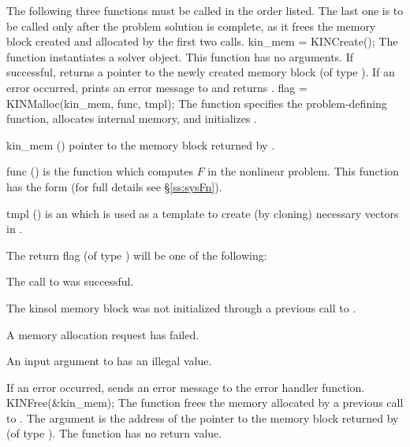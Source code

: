 The following three functions must be called in the order listed. The last one
is to be called only after the problem solution is complete, as it frees the
{\kinsol} memory block created and allocated by the first two calls.
{
  kin\_mem = KINCreate();
}
{
  The function  instantiates a {\kinsol} solver object.
}
{
  This function has no arguments.
}
{
  If successful,  returns a pointer to the newly created 
  {\kinsol} memory block (of type ).
  If an error occurred,  prints an error message to 
  and returns .
}
{}
{
flag = KINMalloc(kin\_mem, func, tmpl);
}
{
  The function  specifies the problem-defining
  function, allocates internal memory, and initializes {\kinsol}.
}
{
  \begin{args}
  \item[kin\_mem] ()
    pointer to the {\kinsol} memory block returned by .
  \item[func] ()
    is the {\C} function which computes $F$ in the nonlinear problem. 
    This function has the form  
    (for full details see \S\ref{ss:sysFn}).
  \item[tmpl] ()
    is an  which is used as a template to create (by cloning)
    necessary vectors in .
  \end{args}
}
{
  The return flag  (of type ) will be one of the following:
  \begin{args}
  \item[\Id{KIN\_SUCCESS}]
    The call to  was successful.
  \item[\Id{KIN\_MEM\_NULL}] 
    The {kinsol} memory block was not initialized through a previous call
    to .
  \item[\Id{KIN\_MEM\_FAIL}] 
    A memory allocation request has failed.
  \item[\Id{KIN\_ILL\_INPUT}] 
    An input argument to  has an illegal value.
  \end{args}
}
{
  If an error occurred,  sends an error message to the
  error handler function.
}
{
  KINFree(\&kin\_mem);
}
{
  The function  frees the memory allocated by
  a previous call to .
}
{
  The argument is the address of the pointer to the {\kinsol} memory block
  returned by  (of type ).
}
{
  The function  has no return value.
}
{}

